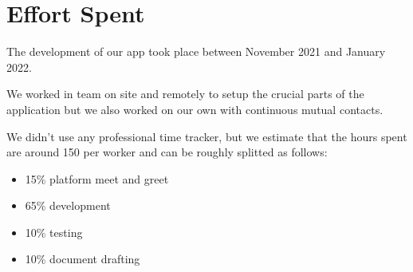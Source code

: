 \chapter{Effort Spent}
The development of our app took place between November 2021 and January 2022.

We worked in team on site and remotely to setup the crucial parts of the application but we also worked on our own with continuous mutual contacts.

We didn’t use any professional time tracker, but we estimate that the hours spent are around 150 per worker and can be roughly splitted as follows:
\begin{itemize}
    \item 15\% platform meet and greet
    \item 65\% development
    \item 10\% testing
    \item 10\% document drafting
\end{itemize}